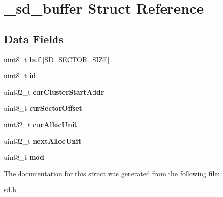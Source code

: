 \hypertarget{struct__sd__buffer}{\section{\-\_\-sd\-\_\-buffer \-Struct \-Reference}
\label{struct__sd__buffer}
}
\subsection*{\-Data \-Fields}
\begin{DoxyCompactItemize}
\item 
\hypertarget{struct__sd__buffer_a3ae6e86f242587e7e120be6921c1dab6}{uint8\-\_\-t {\bfseries buf} \mbox{[}\-S\-D\-\_\-\-S\-E\-C\-T\-O\-R\-\_\-\-S\-I\-Z\-E\mbox{]}}\label{struct__sd__buffer_a3ae6e86f242587e7e120be6921c1dab6}

\item 
\hypertarget{struct__sd__buffer_a50bca902c81b16f2d058b0ce6df1882d}{uint8\-\_\-t {\bfseries id}}\label{struct__sd__buffer_a50bca902c81b16f2d058b0ce6df1882d}

\item 
\hypertarget{struct__sd__buffer_a6a893107307fdd9c934a2550c7ea1457}{uint32\-\_\-t {\bfseries cur\-Cluster\-Start\-Addr}}\label{struct__sd__buffer_a6a893107307fdd9c934a2550c7ea1457}

\item 
\hypertarget{struct__sd__buffer_aa9d642b56edac4c476f38bfa0166ad80}{uint8\-\_\-t {\bfseries cur\-Sector\-Offset}}\label{struct__sd__buffer_aa9d642b56edac4c476f38bfa0166ad80}

\item 
\hypertarget{struct__sd__buffer_ad09110de5bad25015b7c887186cf6f26}{uint32\-\_\-t {\bfseries cur\-Alloc\-Unit}}\label{struct__sd__buffer_ad09110de5bad25015b7c887186cf6f26}

\item 
\hypertarget{struct__sd__buffer_a8720c164cf1d204a3b1eda650e44d24b}{uint32\-\_\-t {\bfseries next\-Alloc\-Unit}}\label{struct__sd__buffer_a8720c164cf1d204a3b1eda650e44d24b}

\item 
\hypertarget{struct__sd__buffer_a772fa49c241ef98561784cbdae25e37f}{uint8\-\_\-t {\bfseries mod}}\label{struct__sd__buffer_a772fa49c241ef98561784cbdae25e37f}

\end{DoxyCompactItemize}


\-The documentation for this struct was generated from the following file\-:\begin{DoxyCompactItemize}
\item 
\hyperlink{sd_8h}{sd.\-h}\end{DoxyCompactItemize}
